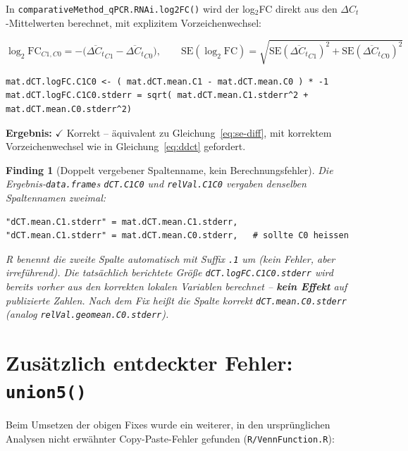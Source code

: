 \documentclass[11pt,a4paper]{article}
\newtheorem{finding}{Finding}
\begin{document}
In \texttt{comparativeMethod\_qPCR.RNAi.log2FC()} wird der log$_2$FC direkt
aus den $\Delta C_t$-Mittelwerten berechnet, mit explizitem
Vorzeichenwechsel:

\begin{equation}
\log_2\text{FC}_{C1,C0} = -\big(\overline{\Delta C_t}_{C1} - \overline{\Delta C_t}_{C0}\big),
\qquad
\text{SE}(\log_2\text{FC}) = \sqrt{\text{SE}(\overline{\Delta C_t}_{C1})^2 + \text{SE}(\overline{\Delta C_t}_{C0})^2}
\end{equation}

\begin{lstlisting}
mat.dCT.logFC.C1C0 <- ( mat.dCT.mean.C1 - mat.dCT.mean.C0 ) * -1
mat.dCT.logFC.C1C0.stderr = sqrt( mat.dCT.mean.C1.stderr^2 + mat.dCT.mean.C0.stderr^2)
\end{lstlisting}

\textbf{Ergebnis:} $\checkmark$ Korrekt -- äquivalent zu
Gleichung~\eqref{eq:se-diff}, mit korrektem Vorzeichenwechsel wie in
Gleichung~\eqref{eq:ddct} gefordert.

\begin{finding}[Doppelt vergebener Spaltenname, kein Berechnungsfehler]
\label{find:dupcol}
Die Ergebnis-\texttt{data.frame}s \texttt{dCT.C1C0} und
\texttt{relVal.C1C0} vergaben denselben Spaltennamen zweimal:

\begin{lstlisting}
"dCT.mean.C1.stderr" = mat.dCT.mean.C1.stderr,
"dCT.mean.C1.stderr" = mat.dCT.mean.C0.stderr,   # sollte C0 heissen
\end{lstlisting}

R benennt die zweite Spalte automatisch mit Suffix \texttt{.1} um (kein
Fehler, aber irreführend). Die tatsächlich berichtete Größe
\texttt{dCT.logFC.C1C0.stderr} wird bereits vorher aus den korrekten lokalen
Variablen berechnet -- \textbf{kein Effekt} auf publizierte Zahlen. Nach dem
Fix heißt die Spalte korrekt \texttt{dCT.mean.C0.stderr}
(analog \texttt{relVal.geomean.C0.stderr}).
\end{finding}

\section{Zusätzlich entdeckter Fehler: \texttt{union5()}}
\label{sec:union5}

Beim Umsetzen der obigen Fixes wurde ein weiterer, in den ursprünglichen
Analysen nicht erwähnter Copy-Paste-Fehler gefunden
(\texttt{R/VennFunction.R}):
\end{document}
